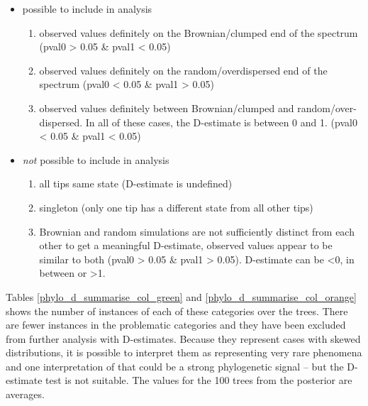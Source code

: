 \documentclass[12pt,letterpaper]{article}
\begin{document}
\begin{itemize}
    \item \colorbox{spec_color_lightgreen!50}{possible to include in analysis}
    \begin{enumerate}[label=(\roman*)]
     \item observed values definitely on the Brownian/clumped end of the spectrum (pval0 > 0.05 \& pval1 < 0.05)
      \item observed values definitely on the random/overdispersed end of the spectrum (pval0 < 0.05 \& pval1 > 0.05)
      \item observed values definitely between Brownian/clumped and random/over-dispersed. In all of these cases, the D-estimate is between 0 and 1. (pval0 < 0.05 \& pval1 < 0.05)
    \end{enumerate}
    \item \colorbox{spec_color_orange!50}{\emph{not} possible to include in analysis}
    \begin{enumerate}[label=(\roman*)]
        \item all tips same state (D-estimate is undefined)
        \item singleton (only one tip has a different state from all other tips)
        \item Brownian and random simulations are not sufficiently distinct from each other to get a meaningful D-estimate, observed values appear to be similar to both (pval0 > 0.05 \& pval1 > 0.05). D-estimate can be <0, in between or >1.
    \end{enumerate}
    
\end{itemize}

Tables \ref{phylo_d_summarise_col_green} and \ref{phylo_d_summarise_col_orange} shows the number of instances of each of these categories over the trees. There are fewer instances in the problematic categories and they have been excluded from further analysis with D-estimates. Because they represent cases with skewed distributions, it is possible to interpret them as representing very rare phenomena and one interpretation of that could be a strong phylogenetic signal -- but the D-estimate test is not suitable. The values for the 100 trees from the posterior are averages.




\end{document}
